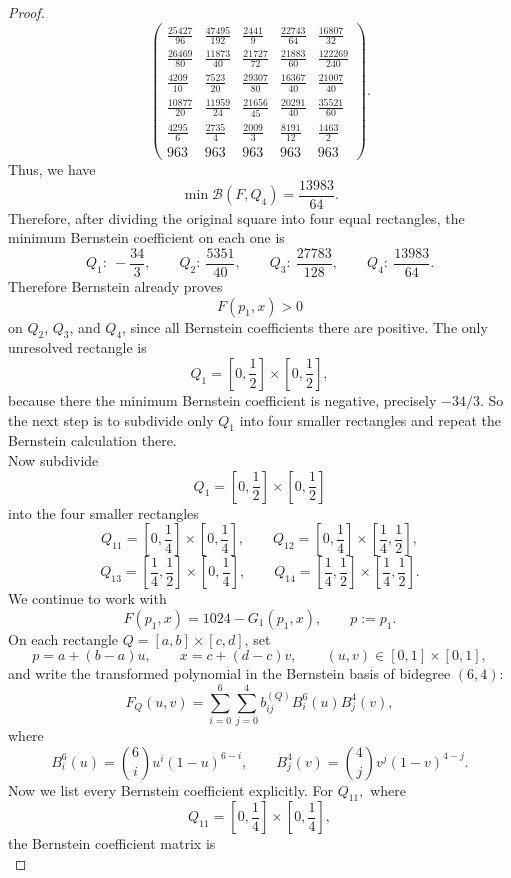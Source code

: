 \documentclass[a4paper,12pt,reqno]{amsart} %
\numberwithin{equation}{section}
\theoremstyle{definition}
\begin{document}
\begin{proof}
\[\begin{pmatrix}
	\frac{25427}{96} & \frac{47495}{192} & \frac{2441}{9} & \frac{22743}{64} & \frac{16807}{32}\\[5mm]
	\frac{26469}{80} & \frac{11873}{40} & \frac{21727}{72} & \frac{21883}{60} & \frac{122269}{240}\\[5mm]
	\frac{4209}{10} & \frac{7523}{20} & \frac{29307}{80} & \frac{16367}{40} & \frac{21007}{40}\\[5mm]
	\frac{10877}{20} & \frac{11959}{24} & \frac{21656}{45} & \frac{20291}{40} & \frac{35521}{60}\\[5mm]
	\frac{4295}{6} & \frac{2735}{4} & \frac{2009}{3} & \frac{8191}{12} & \frac{1463}{2}\\[5mm]
	963 & 963 & 963 & 963 & 963
\end{pmatrix}.
\]
Thus, we have 
\[
\min \mathcal B(F,Q_4)=\frac{13983}{64}.
\]
Therefore, after dividing the original square into four equal rectangles, the minimum Bernstein coefficient on each one is
\[
Q_1:\ -\frac{34}{3},\qquad
Q_2:\ \frac{5351}{40},\qquad
Q_3:\ \frac{27783}{128},\qquad
Q_4:\ \frac{13983}{64}.
\]
Therefore Bernstein already proves
\[
F(p_1,x)>0
\]
on \(Q_2\), \(Q_3\), and \(Q_4\), since all Bernstein coefficients there are positive.
The only unresolved rectangle is
\[
Q_1=\left[0,\frac12\right]\times\left[0,\frac12\right],
\]
because there the minimum Bernstein coefficient is negative, precisely
$
-{34}/{3}.
$
So the next step is to subdivide only \(Q_1\) into four smaller rectangles and repeat the Bernstein calculation there.\\[2mm]
Now subdivide
\[
Q_1=\left[0,\frac12\right]\times\left[0,\frac12\right]
\]
into the four smaller rectangles
\[
Q_{11}=\left[0,\frac14\right]\times\left[0,\frac14\right],\qquad
Q_{12}=\left[0,\frac14\right]\times\left[\frac14,\frac12\right],
\]
\[
Q_{13}=\left[\frac14,\frac12\right]\times\left[0,\frac14\right],\qquad
Q_{14}=\left[\frac14,\frac12\right]\times\left[\frac14,\frac12\right].
\]
We continue to work with
\[
F(p_1,x)=1024-G_1(p_1,x),
\qquad p:=p_1.
\]
On each rectangle \(Q=[a,b]\times[c,d]\), set
\[
p=a+(b-a)u,\qquad x=c+(d-c)v,\qquad (u,v)\in[0,1]\times[0, 1],
\]
and write the transformed polynomial in the Bernstein basis of bidegree \((6,4)\):
\[
F_Q(u,v)=\sum_{i=0}^{6}\sum_{j=0}^{4} b^{(Q)}_{ij} B_i^6(u)B_j^4(v),
\]
where
\[
B_i^6(u)=\binom{6}{i}u^i(1-u)^{6-i},
\qquad
B_j^4(v)=\binom{4}{j}v^j(1-v)^{4-j}.
\]
Now we list every Bernstein coefficient explicitly.
For $Q_{11},$ where
\[
Q_{11}=\left[0,\frac14\right]\times\left[0,\frac14\right],
\]
the Bernstein coefficient matrix is\\

\end{proof}
\end{document}
